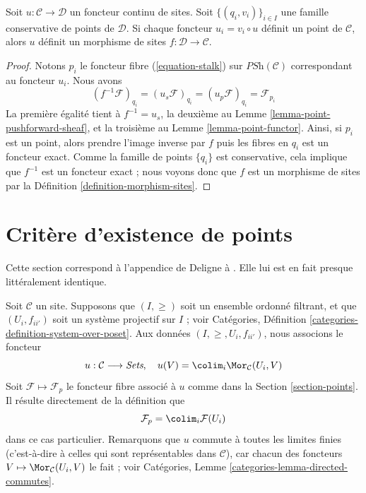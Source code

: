 \begin{lemma}
\label{lemma-check-morphism-sites}
Soit $u : \mathcal{C} \to \mathcal{D}$ un foncteur continu de sites.
Soit $\{(q_i, v_i)\}_{i\in I}$ une famille conservative de points de
$\mathcal{D}$. Si chaque foncteur $u_i = v_i \circ u$ définit
un point de $\mathcal{C}$,
alors $u$ définit un morphisme de sites $f : \mathcal{D} \to \mathcal{C}$.
\end{lemma}

\begin{proof}
Notons $p_i$ le foncteur fibre (\ref{equation-stalk}) sur
$\textit{PSh}(\mathcal{C})$ correspondant au foncteur $u_i$. Nous avons
$$
(f^{-1}\mathcal{F})_{q_i} =
(u_s\mathcal{F})_{q_i} =
(u_p\mathcal{F})_{q_i} =
\mathcal{F}_{p_i}
$$
La première égalité tient à $f^{-1} = u_s$, la deuxième au
Lemme \ref{lemma-point-pushforward-sheaf}, et la troisième
au Lemme \ref{lemma-point-functor}.
Ainsi, si $p_i$ est un point, alors prendre l’image inverse par $f$
puis les fibres en $q_i$ est un foncteur exact.
Comme la famille de points $\{q_i\}$ est conservative, cela
implique que $f^{-1}$ est un foncteur exact ; nous voyons donc
que $f$ est un morphisme de sites par la Définition \ref{definition-morphism-sites}.
\end{proof}





\section{Critère d’existence de points}
\label{section-criterion-points}

\noindent
Cette section correspond à l’appendice de Deligne à \cite[Expos\'e VI]{SGA4}.
Elle lui est en fait presque littéralement identique.

\medskip\noindent
Soit $\mathcal{C}$ un site.
Supposons que $(I, \geq)$ soit un ensemble ordonné filtrant,
et que $(U_i, f_{ii'})$ soit un système projectif sur $I$ ; voir
Catégories, Définition \ref{categories-definition-system-over-poset}.
Aux données $(I, \geq, U_i, f_{ii'})$, nous associons le foncteur
$$
u : \mathcal{C} \longrightarrow \textit{Sets}, \quad
u(V) = \colim_i \Mor_\mathcal{C}(U_i , V)
$$
Soit $\mathcal{F} \mapsto \mathcal{F}_p$ le foncteur fibre
associé à $u$ comme dans la Section \ref{section-points}.
Il résulte directement de la définition que
$$
\mathcal{F}_p = \colim_i \mathcal{F}(U_i)
$$
dans ce cas particulier.
Remarquons que $u$ commute à toutes les limites finies (c’est-à-dire à celles qui
sont représentables dans $\mathcal{C}$), car chacun des foncteurs
$V \mapsto \Mor_\mathcal{C}(U_i , V)$ le fait ; voir
Catégories, Lemme \ref{categories-lemma-directed-commutes}.

